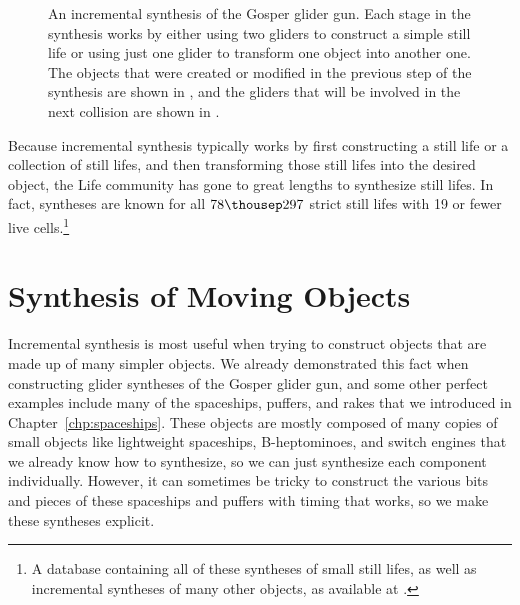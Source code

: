 \begin{figure}[!htb]
	\centering
	
	\caption{An incremental synthesis of the Gosper glider gun. Each stage in the synthesis works by either using two gliders to construct a simple still life or using just one glider to transform one object into another one. The objects that were created or modified in the previous step of the synthesis are shown in , and the gliders that will be involved in the next collision are shown in .}\label{fig:gosper_sequential}
\end{figure}

Because incremental synthesis typically works by first constructing a still life or a collection of still lifes, and then transforming those still lifes into the desired object, the Life community has gone to great lengths to synthesize still lifes. In fact, syntheses are known for all $78{\thousep}297$ strict still lifes with 19 or fewer live cells.\footnote{A database containing all of these syntheses of small still lifes, as well as incremental syntheses of many other objects, as available at .}


\section{Synthesis of Moving Objects}\label{sec:incremental_synthesis_ships}

Incremental synthesis is most useful when trying to construct objects that are made up of many simpler objects. We already demonstrated this fact when constructing glider syntheses of the Gosper glider gun, and some other perfect examples include many of the spaceships, puffers, and rakes that we introduced in Chapter~\ref{chp:spaceships}. These objects are mostly composed of many copies of small objects like lightweight spaceships, B-heptominoes, and switch engines that we already know how to synthesize, so we can just synthesize each component individually. However, it can sometimes be tricky to construct the various bits and pieces of these spaceships and puffers with timing that works, so we make these syntheses explicit. 


